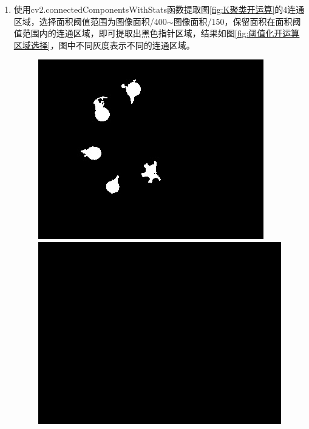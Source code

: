\documentclass[a4paper]{ctexart}
\begin{document}
\begin{enumerate}[label=\arabic*、]
\begin{enumerate}[label=\alph*)]
		\item 使用cv2.connectedComponentsWithStats函数提取图\ref{fig:K聚类开运算}的4连通区域，选择面积阈值范围为图像面积/400$\sim$图像面积/150，保留面积在面积阈值范围内的连通区域，即可提取出黑色指针区域，结果如图\ref{fig:阈值化开运算区域选择}，图中不同灰度表示不同的连通区域。
		\begin{figure}[htbp]
			\centering
			\begin{minipage}[t]{0.25\textwidth}
				\centering
				\includegraphics[width=\textwidth]{figure/drop_2/img1.jpg}
			\end{minipage}
			\begin{minipage}[t]{0.25\textwidth}
				\centering
				\includegraphics[width=\textwidth]{figure/drop_2/img2.jpg}

\end{minipage}
\end{figure}
\end{enumerate}
\end{enumerate}
\end{document}
